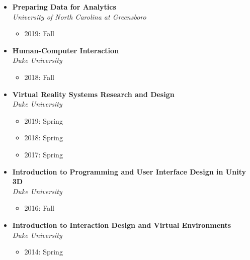 \documentclass[wideaddress]{vitae}
\begin{document}
\begin{itemize}
\begin{itemize}
        \end{itemize}
        \item \textbf{Preparing Data for Analytics}              						\\\textit{University of North Carolina at Greensboro}
        \begin{itemize}
            \item 2019: Fall
        \end{itemize}
        \item \textbf{Human-Computer Interaction} 				    					\\\textit{Duke University}
        \begin{itemize}
            \item 2018: Fall
        \end{itemize}
        \item \textbf{Virtual Reality Systems Research and Design}						\\\textit{Duke University}
        \begin{itemize}
            \item 2019: Spring
            \item 2018: Spring
            \item 2017: Spring
        \end{itemize}
        \item \textbf{Introduction to Programming and User Interface Design in Unity 3D}\\\textit{Duke University}
        \begin{itemize}
            \item 2016: Fall
        \end{itemize}
        \item \textbf{Introduction to Interaction Design and Virtual Environments}   	\\\textit{Duke University}
        \begin{itemize}
            \item 2014: Spring
        \end{itemize}
\end{itemize}
\end{document}
